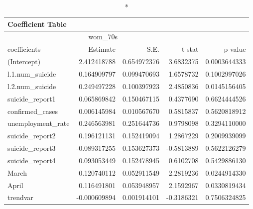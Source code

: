 \begin{longtable}{lrrrr}
\caption*{
{\large Coefficient Table}
} \\ 
\toprule
\multicolumn{4}{c}{wom\_70s} &  \\ 
\cmidrule(lr){1-4}
coefficients & Estimate & S.E. & t stat & p value \\ 
\midrule\addlinespace[2.5pt]
(Intercept) & 2.412418788 & 0.654972376 & 3.6832375 & 0.0003644333 \\ 
l.1.num\_suicide & 0.164909797 & 0.099470693 & 1.6578732 & 0.1002997026 \\ 
l.2.num\_suicide & 0.249497228 & 0.100397923 & 2.4850836 & 0.0145156405 \\ 
suicide\_report1 & 0.065869842 & 0.150467115 & 0.4377690 & 0.6624444526 \\ 
confirmed\_cases & 0.006145984 & 0.010567670 & 0.5815837 & 0.5620818912 \\ 
unemployment\_rate & 0.246563981 & 0.251644736 & 0.9798098 & 0.3294110000 \\ 
suicide\_report2 & 0.196121131 & 0.152419094 & 1.2867229 & 0.2009939099 \\ 
suicide\_report3 & -0.089317255 & 0.153627373 & -0.5813889 & 0.5622126279 \\ 
suicide\_report4 & 0.093053449 & 0.152478945 & 0.6102708 & 0.5429886130 \\ 
March & 0.120740112 & 0.052911549 & 2.2819236 & 0.0244914330 \\ 
April & 0.116491801 & 0.053948957 & 2.1592967 & 0.0330819434 \\ 
trendvar & -0.000609894 & 0.001914101 & -0.3186321 & 0.7506324825 \\ 
\bottomrule
\end{longtable}

